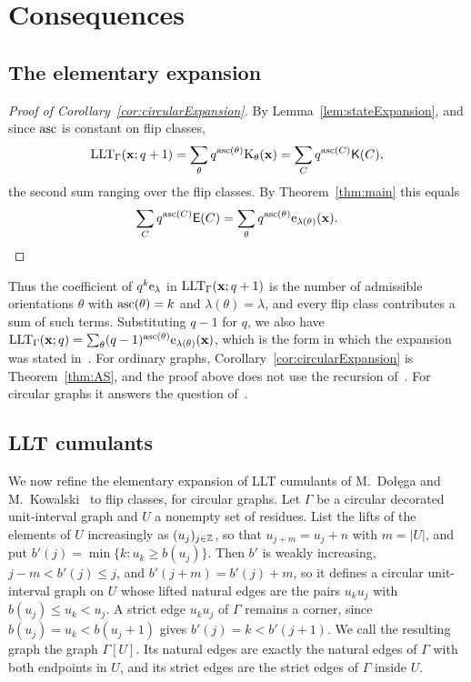 \section{Consequences}\label{sec:consequences}

\subsection{The elementary expansion}

\begin{proof}[Proof of Corollary~\ref{cor:circularExpansion}]
By Lemma~\ref{lem:stateExpansion}, and since $\operatorname{asc}$ is constant on flip classes,
\[
 \operatorname{LLT}_\Gamma(\mathbf{x};q+1)=\sum_{\theta}q^{\operatorname{asc}(\theta)}\mathrm{K}_{\theta}(\mathbf{x})
 =\sum_Cq^{\operatorname{asc}(C)}\mathsf{K}(C),
\]
the second sum ranging over the flip classes.
By Theorem~\ref{thm:main} this equals
\[
 \sum_Cq^{\operatorname{asc}(C)}\mathsf{E}(C)=\sum_\theta q^{\operatorname{asc}(\theta)}\mathrm{e}_{\lambda(\theta)}(\mathbf{x}).
\qedhere
\]
\end{proof}

Thus the coefficient of $q^k\mathrm{e}_\lambda$ in $\operatorname{LLT}_\Gamma(\mathbf{x};q+1)$ is the
number of admissible orientations $\theta$ with $\operatorname{asc}(\theta)=k$ and
$\lambda(\theta)=\lambda$, and every flip class contributes a sum of such terms.
Substituting $q-1$ for $q$, we also have
$\operatorname{LLT}_\Gamma(\mathbf{x};q)=\sum_\theta(q-1)^{\operatorname{asc}(\theta)}\mathrm{e}_{\lambda(\theta)}(\mathbf{x})$,
which is the form in which the expansion was stated
in~\cite{AlexanderssonSulzgruber2022}.
For ordinary graphs, Corollary~\ref{cor:circularExpansion} is
Theorem~\ref{thm:AS}, and the proof above does not use the recursion
of~\cite{AlexanderssonSulzgruber2022}.
For circular graphs it answers the question
of~\cite[Sec.~6.8]{AlexanderssonSulzgruber2022}.

\subsection{LLT cumulants}

We now refine the elementary expansion of LLT cumulants of M.~Dołęga and
M.~Kowalski~\cite{DolegaKowalski2021x} to flip classes, for circular graphs.
Let $\Gamma$ be a circular decorated unit-interval graph and $U$ a nonempty set of
residues.
List the lifts of the elements of $U$ increasingly as $(u_j)_{j\in\mathbb{Z}}$, so that
$u_{j+m}=u_j+n$ with $m=|U|$, and put $b'(j)=\min\{k:u_k\geq b(u_j)\}$.
Then $b'$ is weakly increasing, $j-m<b'(j)\leq j$, and $b'(j+m)=b'(j)+m$, so it
defines a circular unit-interval graph on $U$ whose lifted natural edges are the
pairs $u_ku_j$ with $b(u_j)\leq u_k<u_j$.
A strict edge $u_ku_j$ of $\Gamma$ remains a corner, since $b(u_j)=u_k<b(u_j+1)$ gives
$b'(j)=k<b'(j+1)$.
We call the resulting graph the  graph $\Gamma[U]$.
Its natural edges are exactly the natural edges of $\Gamma$ with both endpoints in
$U$, and its strict edges are the strict edges of $\Gamma$ inside $U$.

